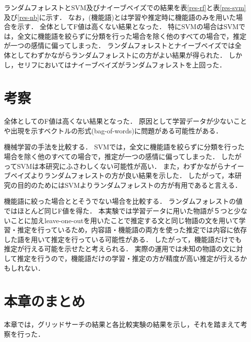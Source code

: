 ランダムフォレストとSVM及びナイーブベイズでの結果を表\ref{res-rf}と表\ref{res-svm}及び\ref{res-nb}に示す．
なお，(機能語)とは学習や推定時に機能語のみを用いた場合を示す．
全体としてF値は高くない結果となった．
特にSVMの場合はSVMでは，全文に機能語を絞らずに分類を行った場合を除く他のすべての場合で，推定が一つの感情に偏ってしまった．
ランダムフォレストとナイーブベイズでは全体としてわずかながらランダムフォレストにの方がよい結果が得られた．
しかし，セリフにおいてはナイーブベイズがランダムフォレストを上回った．


\section{考察}
全体としてのF値は高くない結果となった．
原因として学習データが少ないことや出現を示すベクトルの形式(bag-of-words)に問題がある可能性がある．

機械学習の手法を比較する．
SVMでは，全文に機能語を絞らずに分類を行った場合を除く他のすべての場合で，推定が一つの感情に偏ってしまった．
したがってSVMは本研究にふさわしくない可能性が高い．
また，わずかながらナイーブベイズよりランダムフォレストの方が良い結果を示した．
したがって，本研究の目的のためにはSVMよりランダムフォレストの方が有用であると言える．

機能語に絞った場合ととそうでない場合を比較する．
ランダムフォレストの値ではほとんど同じF値を得た．
本実験では学習データに用いた物語が５つと少ないことに加えleave-one-outを用いたことで推定する文と同じ物語の文を用いて学習・推定を行っているため，内容語・機能語の両方を使った推定では内容に依存した語を用いて推定を行っている可能性がある．
したがって，機能語だけでも推定が行える可能を示せたと考えられる．
実際の運用では未知の物語の文に対して推定を行うので，機能語だけの学習・推定の方が精度が高い推定が行えるかもしれない．



\section{本章のまとめ}
本章では，グリッドサーチの結果と各比較実験の結果を示し，それを踏まえて考察を行った．


